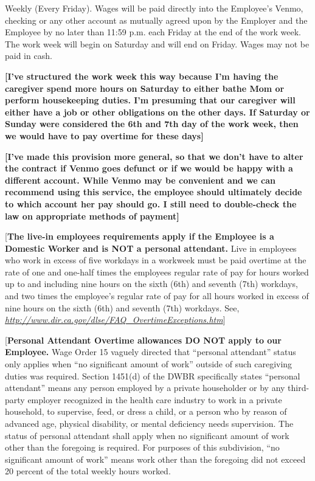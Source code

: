 \documentclass[]{article}
\begin{document}
Weekly (Every Friday). Wages will be paid directly into the Employee's
Venmo, checking or any other account as mutually agreed upon by the
Employer and the Employee by no later than 11:59 p.m. each Friday at the
end of the work week. The work week will begin on Saturday and will end
on Friday. Wages may not be paid in cash.

\textbf{{[}I've structured the work week this way because I'm having the
caregiver spend more hours on Saturday to either bathe Mom or perform
housekeeping duties. I'm presuming that our caregiver will either have a
job or other obligations on the other days. If Saturday or Sunday were
considered the 6th and 7th day of the work week, then we would have to
pay overtime for these days{]}}

\textbf{{[}I've made this provision more general, so that we don't have
to alter the contract if Venmo goes defunct or if we would be happy with
a different account. While Venmo may be convenient and we can recommend
using this service, the employee should ultimately decide to which
account her pay should go. I still need to double-check the law on
appropriate methods of payment{]} }

{[}\textbf{The live-in employees requirements apply if the Employee is a
Domestic Worker and is NOT a personal attendant.} Live in employees who
work in excess of five workdays in a workweek must be paid overtime at
the rate of one and one-half times the employees regular rate of pay for
hours worked up to and including nine hours on the sixth (6th) and
seventh (7th) workdays, and two times the employee's regular rate of pay
for all hours worked in excess of nine hours on the sixth (6th) and
seventh (7th) workdays. See,
\href{http://www.dir.ca.gov/dlse/FAQ_OvertimeExceptions.htm}{\emph{http://www.dir.ca.gov/dlse/FAQ\_OvertimeExceptions.htm}}{]}

{[}\textbf{Personal Attendant Overtime allowances DO NOT apply to our
Employee.} Wage Order 15 vaguely directed that ``personal attendant''
status only applies when ``no significant amount of work'' outside of
such caregiving duties was required. Section 1451(d) of the DWBR
specifically states ``personal attendant'' means any person employed by
a private householder or by any third-party employer recognized in the
health care industry to work in a private household, to supervise, feed,
or dress a child, or a person who by reason of advanced age, physical
disability, or mental deficiency needs supervision. The status of
personal attendant shall apply when no significant amount of work other
than the foregoing is required. For purposes of this subdivision, ``no
significant amount of work'' means work other than the foregoing did not
exceed 20 percent of the total weekly hours worked.
\end{document}
